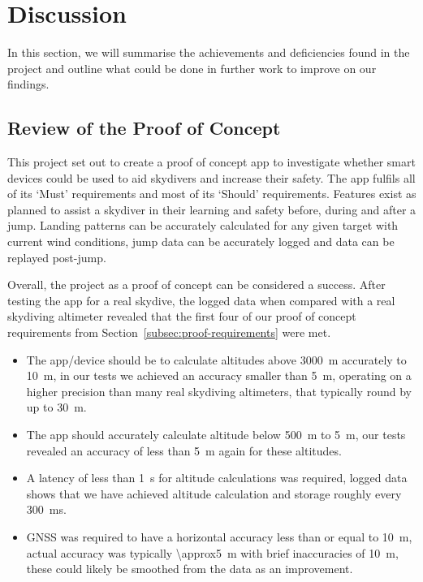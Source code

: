 \section{Discussion}\label{sec:discussion}
In this section, we will summarise the achievements and deficiencies found in the project and outline what could be done in further work to improve on our findings.


\subsection{Review of the Proof of Concept}
This project set out to create a proof of concept app to investigate whether smart devices could be used to aid skydivers and increase their safety.
The app fulfils all of its `Must' requirements and most of its `Should' requirements.
Features exist as planned to assist a skydiver in their learning and safety before, during and after a jump. Landing patterns can be accurately calculated for any given target with current wind conditions, jump data can be accurately logged and data can be replayed post-jump.

Overall, the project as a proof of concept can be considered a success. After testing the app for a real skydive, the logged data when compared with a real skydiving altimeter revealed that the first four of our proof of concept requirements from Section~\ref{subsec:proof-requirements} were met.

\begin{itemize}
  \item The app/device should be to calculate altitudes above \SI{3000}{\metre} accurately to \SI{10}{\metre}, in our tests we achieved an accuracy smaller than \SI{5}{\metre}, operating on a higher precision than many real skydiving altimeters, that typically round by up to \SI{30}{\metre}.

  \item The app should accurately calculate altitude below \SI{500}{\metre} to \SI{5}{\metre}, our tests revealed an accuracy of less than \SI{5}{\metre} again for these altitudes.

\item A latency of less than \SI{1}{\second} for altitude calculations was required, logged data shows that we have achieved altitude calculation and storage roughly every \SI{300}{\milli\second}.

\item GNSS was required to have a horizontal accuracy less than or equal to \SI{10}{\metre}, actual accuracy was typically \SI{\approx5}{\metre} with brief inaccuracies of \SI{10}{\metre}, these could likely be smoothed from the data as an improvement.
\end{itemize}

